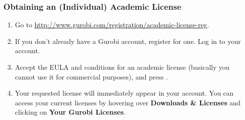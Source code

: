 \documentclass[12pt]{article}
\begin{document}
\subsubsection{Obtaining an (Individual) Academic License}
\begin{enumerate}
    \item Go to \url{http://www.gurobi.com/registration/academic-license-reg}.
    \item If you don't already have a Gurobi account, register for one.
        Log in to your account.
    \item Accept the EULA and conditions for an academic license (basically you cannot use it for commercial purposes), and press .
    \item Your requested license will immediately appear in your account.
        You can access your current licenses by hovering over \textbf{Downloads \& Licenses} and clicking on \textbf{Your Gurobi Licenses}.
\end{enumerate}
\end{document}

